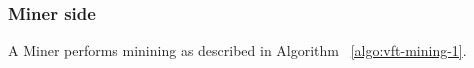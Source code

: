 

\subsubsection{Miner side\\}

A Miner performs minining as described in Algorithm ~\ref{algo:vft-mining-1}.

